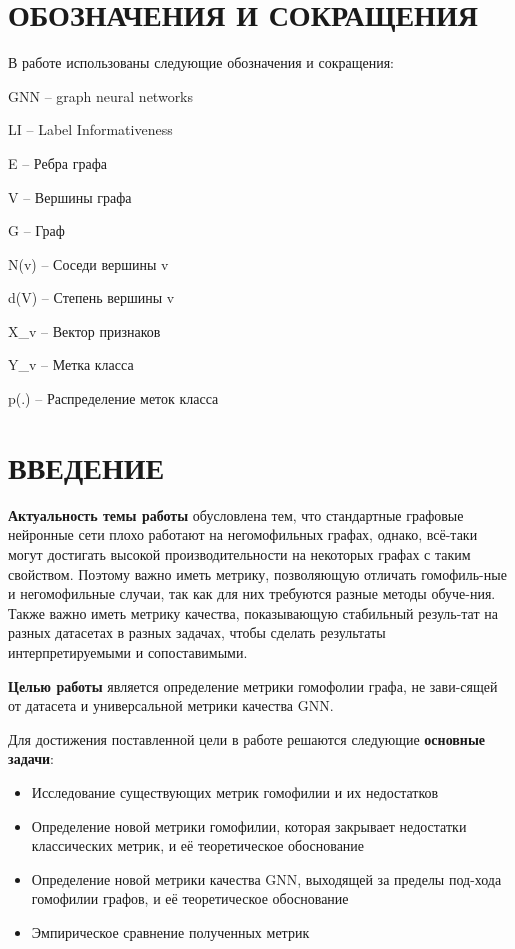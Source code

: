 \documentclass[a4paper,14pt]{article}
\begin{document}
    \newpage
    
	\section*{ \hfill ОБОЗНАЧЕНИЯ И СОКРАЩЕНИЯ \hfill}
	
	В работе  использованы следующие обозначения и сокращения:
	
	GNN	–	graph neural networks
	
	LI	–	Label Informativeness
	
	E	–	Ребра графа
	
	V	–	Вершины графа
	
	G	–	Граф
	
	N(v)	–	Соседи вершины v
	
	d(V)	–	Степень вершины v
	
	X\_v	–	Вектор признаков
	
	Y\_v	–	Метка класса 
	
	p(.)	–	Распределение меток класса
	
	\newpage
	
	\section*{ \hfill ВВЕДЕНИЕ \hfill}
	
	\textbf{Актуальность темы работы} обусловлена тем, что стандартные графовые нейронные сети плохо работают на негомофильных графах, однако, всё-таки могут достигать высокой производительности на некоторых графах с таким свойством.
	Поэтому важно иметь метрику, позволяющую отличать гомофиль-ные и негомофильные случаи, так как для них требуются разные методы обуче-ния.
	Также важно иметь метрику качества, показывающую стабильный резуль-тат на разных датасетах в разных задачах, чтобы сделать результаты интерпретируемыми и сопоставимыми. 
	
	\textbf{Целью работы} является определение метрики гомофолии графа, не зави-сящей от датасета и универсальной метрики качества GNN. 
	
	Для достижения поставленной цели в работе решаются следующие \textbf{основные задачи}:
	
	\begin{itemize}
		
	\item Исследование существующих метрик гомофилии и их недостатков
	
	\item Определение новой метрики гомофилии, которая закрывает недостатки классических метрик, и её теоретическое обоснование
	
	\item Определение новой метрики качества GNN, выходящей за пределы под-хода гомофилии графов, и её теоретическое обоснование
	
	\item Эмпирическое сравнение полученных метрик
	
	\end{itemize}
	
\end{document}
